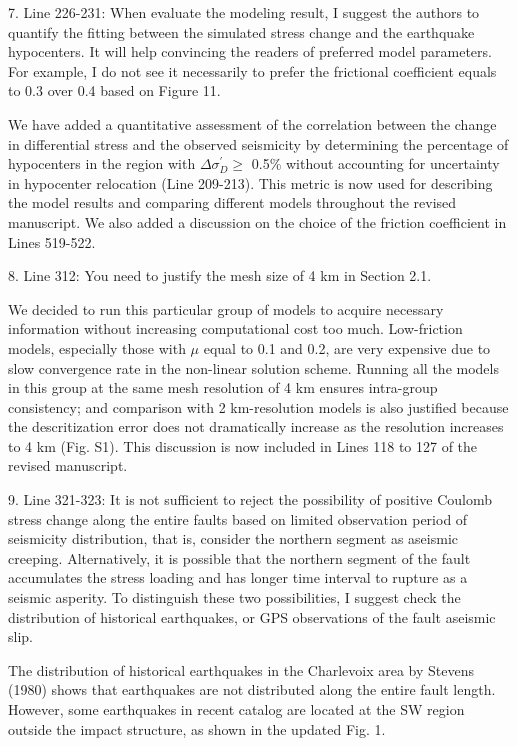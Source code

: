 \documentclass[12pt]{article}
\begin{document}
\begin{response}{7. Line 226-231: When evaluate the modeling result, I suggest the authors to quantify the fitting between the simulated stress change and the earthquake hypocenters. It will help convincing the readers of preferred model parameters. For example, I do not see it necessarily to prefer the frictional coefficient equals to 0.3 over 0.4 based on Figure 11.}

   We have added a quantitative assessment of the correlation between the change in differential stress and the observed seismicity by determining the percentage of hypocenters in the region with $\Delta\sigma_{D}^\prime \ge$ 0.5\% without accounting for uncertainty in hypocenter relocation (Line 209-213). This metric is now used for describing the model results and comparing different models throughout the revised manuscript. We also added a discussion on the choice of the friction coefficient in Lines 519-522.

\end{response}

\begin{response}{8. Line 312: You need to justify the mesh size of 4 km in Section 2.1.}

We decided to run this particular group of models to acquire necessary information without increasing computational cost too much. Low-friction models, especially those with $\mu$ equal to 0.1 and 0.2, are very expensive due to slow convergence rate in the non-linear solution scheme. Running all the models in this group at the same mesh resolution of 4 km ensures intra-group consistency; and comparison with 2 km-resolution models is also justified because the descritization error does not dramatically increase as the resolution increases to 4 km (Fig. S1). This discussion is now included in Lines 118 to 127 of the revised manuscript. 

\end{response}

\begin{response}{9. Line 321-323: It is not sufficient to reject the possibility of positive Coulomb stress change along the entire faults based on limited observation period of seismicity distribution, that is, consider the northern segment as aseismic creeping. Alternatively, it is possible that the northern segment of the fault accumulates the stress loading and has longer time interval to rupture as a seismic asperity. To distinguish these two possibilities, I suggest check the distribution of historical earthquakes, or GPS observations of the fault aseismic slip.}

  The distribution of historical earthquakes in the Charlevoix area by Stevens (1980) shows that earthquakes are not distributed along the entire fault length. However, some earthquakes  in recent catalog are located at the SW region outside the impact structure, as shown in the updated Fig. 1.
  
\end{response}
\end{document}
